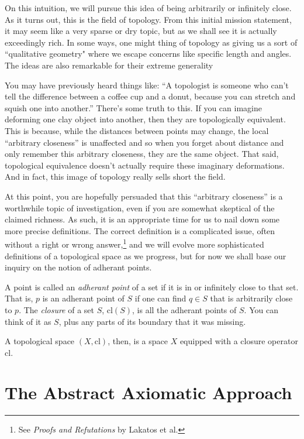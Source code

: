 \documentclass{report}
\newcommand{\cl}{\mathrm{cl}}
\begin{document}
On this intuition, we will pursue this idea of being arbitrarily or infinitely close. As it turns out, this is the field of topology. From this initial mission statement, it may seem like a very sparse or dry topic, but as we shall see it is actually exceedingly rich. In some ways, one might thing of topology as giving us a sort of ``qualitative geometry" where we escape concerns like specific length and angles. The ideas are also remarkable for their extreme generality

You may have previously heard things like: ``A topologist is someone who can't tell the difference between a coffee cup and a donut, because you can stretch and squish one into another.'' There's some truth to this. If you can imagine deforming one clay object into another, then they are topologically equivalent. This is because, while the distances between points may change, the local ``arbitrary closeness'' is unaffected and so when you forget about distance and only remember this arbitrary closeness, they are the same object. That said, topological equivalence doesn't actually require these imaginary deformations. And in fact, this image of topology really sells short the field.

At this point, you are hopefully persuaded that this ``arbitrary closeness'' is a worthwhile topic of investigation, even if you are somewhat skeptical of the claimed richness. As such, it is an appropriate time for us to nail down some more precise definitions. The correct definition is a complicated issue, often without a right or wrong answer,\footnote{See \emph{Proofs and Refutations} by Lakatos et al.} and we will evolve more sophisticated definitions of a topological space as we progress, but for now we shall base our inquiry on the notion of adherant points.

A point is called an \emph{adherant point} of a set if it is in or infinitely close to that set. That is, $p$ is an adherant point of $S$ if one can find $q ∈ S$ that is arbitrarily close to $p$. The \emph{closure} of a set $S$, $\cl(S)$, is all the adherant points of $S$. You can think of it as $S$, plus any parts of its boundary that it was missing.

A topological space $(X, \cl)$, then, is a space $X$ equipped with a closure operator $\cl$.

\section{The Abstract Axiomatic Approach}
\end{document}
